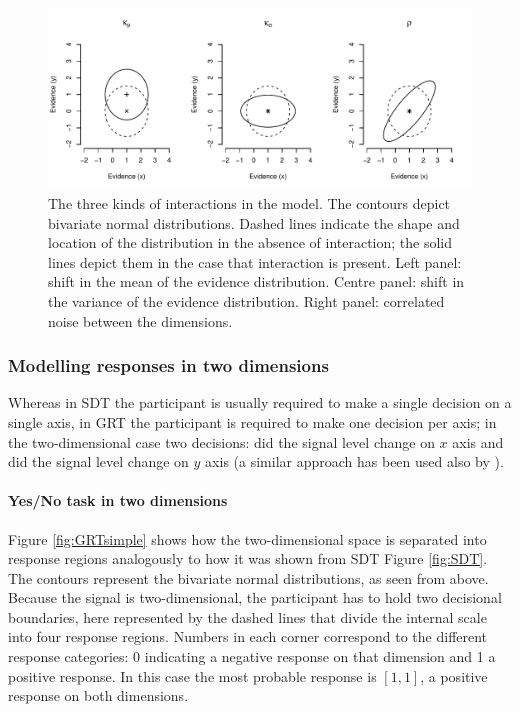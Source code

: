 \documentclass{article}\usepackage{knitr}
\begin{document}
\begin{figure}
\begin{center}
\begin{knitrout}
\color{fgcolor}
\includegraphics[width=\maxwidth]{figure/unnamed-chunk-8-1} 

\end{knitrout}
\end{center}
\caption{The three kinds of interactions in the model. The contours depict bivariate normal distributions. Dashed lines indicate the shape and location of the distribution in the absence of interaction; the solid lines depict them in the case that interaction is present. Left panel: shift in the mean of the evidence distribution. Centre panel: shift in the variance of the evidence distribution. Right panel: correlated noise between the dimensions.}
\label{fig:GRTinteractions}
\end{figure}

\subsubsection{Modelling responses in two dimensions}
\label{sec:modelling_responses}

Whereas in SDT the participant is usually required to make a single decision on a single axis, in GRT the participant is required to make one decision per axis; in the two-dimensional case two decisions: did the signal level change on $x$ axis and did the signal level change on $y$ axis (a similar approach has been used also by \cite{wickens1992}). 

\paragraph{Yes/No task in two dimensions}

Figure \ref{fig:GRTsimple} shows how the two-dimensional space is separated into response regions analogously to how it was shown from SDT Figure \ref{fig:SDT}. The contours represent the bivariate normal distributions, as seen from above. Because the signal is two-dimensional, the participant has to hold two decisional boundaries, here represented by the dashed lines that divide the internal scale into four response regions. Numbers in each corner correspond to the different response categories: 0 indicating a negative response on that dimension and 1 a positive response. In this case the most probable response is $[1,1]$, a positive response on both dimensions.
\end{document}

